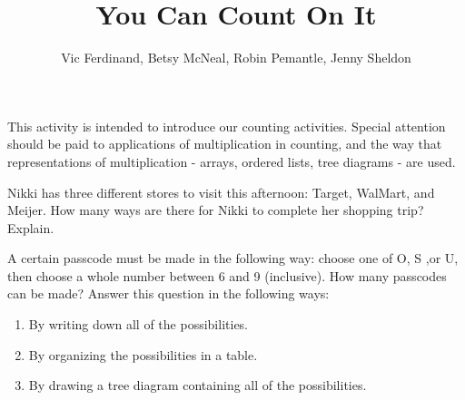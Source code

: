 \documentclass{ximera}
\title{You Can Count On It}
\author{Vic Ferdinand, Betsy McNeal, Robin Pemantle, Jenny Sheldon}
\begin{document}
\begin{abstract}
\end{abstract}
\maketitle

\begin{instructorIntro}
This activity is intended to introduce our counting activities.  Special attention should be paid to applications of multiplication in counting, and the way that representations of multiplication - arrays, ordered lists, tree diagrams - are used.

\end{instructorIntro}

\begin{problem}
Nikki has three different stores to visit this afternoon: Target, WalMart, and Meijer.  How many ways are there for Nikki to complete her shopping trip?  Explain.
\end{problem}





\begin{problem}
A certain passcode must be made in the following way: choose one of O, S ,or U, then choose a whole number between 6 and 9 (inclusive).  How many passcodes can be made?  Answer this question in the following ways:
\begin{enumerate}
\item By writing down all of the possibilities.
\item By organizing the possibilities in a table.
\item By drawing a tree diagram containing all of the possibilities.
\end{enumerate}
\end{problem}
\end{document}
